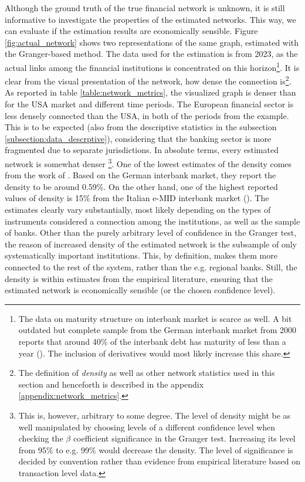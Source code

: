 \documentclass[12pt]{article}
\begin{document}
Although the ground truth of the true financial network is unknown, it is still informative to investigate the properties of the estimated networks. This way, we can evaluate if the estimation results are economically sensible. Figure \ref{fig:actual_network} shows two representations of the same graph, estimated with the Granger-based method. The data used for the estimation is from 2023, as the actual links among the financial institutions is concentrated on this horizon\footnote{The data on maturity structure on interbank market is scarce as well. A bit outdated but complete sample from the German interbank market from 2000 reports that around 40\% of the interbank debt has maturity of less than a year (\cite{upper04}). The inclusion of derivatives would most likely increase this share.}. It is clear from the visual presentation of the network, how dense the connection is\footnote{The definition of \textit{density} as well as other network statistics used in this section and henceforth is described in the appendix \ref{appendix:network_metrics}.}. As reported in table \ref{table:network_metrics}, the visualized graph is denser than for the USA market and different time periods. The European financial sector is less densely connected than the USA, in both of the periods from the example. This is to be expected (also from the descriptive statistics in the subsection \ref{subsection:data_descrptive}), considering that the banking sector is more fragmented due to separate jurisdictions. In absolute terms, every estimated network is somewhat denser \footnote{This is, however, arbitrary to some degree. The level of density might be as well manipulated by choosing levels of a different confidence level when checking the $\beta$ coefficient significance in the Granger test. Increasing its level from 95\% to e.g. 99\% would decrease the density. The level of significance is decided by convention rather than evidence from empirical literature based on transaction level data.}. One of the lowest estimates of the density comes from the work of \cite{anand15}. Based on the German interbank market, they report the density to be around 0.59\%. On the other hand, one of the highest reported values of density is 15\% from the Italian e-MID interbank market (\cite{fricke15}). The estimates clearly vary substantially, most likely depending on the types of instruments considered a connection among the institutions, as well as the sample of banks. Other than the purely arbitrary level of confidence in the Granger test, the reason of increased density of the estimated network is the subsample of only systematically important institutions. This, by definition, makes them more connected to the rest of the system, rather than the e.g. regional banks. Still, the density is within estimates from the empirical literature, ensuring that the estimated network is economically sensible (or the chosen confidence level).
\end{document}

